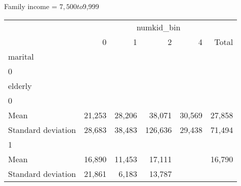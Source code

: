 Family income = $7,500 to $9,999
\begin{tabular}{llllll}
\cline{1-6}
\multicolumn{1}{c}{} &
  \multicolumn{5}{|c}{numkid\_bin} \\
\multicolumn{1}{c}{} &
  \multicolumn{1}{|r}{0} &
  \multicolumn{1}{r}{1} &
  \multicolumn{1}{r}{2} &
  \multicolumn{1}{r}{4} &
  \multicolumn{1}{r}{Total} \\
\cline{1-6}
\multicolumn{1}{l}{marital} &
  \multicolumn{1}{|r}{} &
  \multicolumn{1}{r}{} &
  \multicolumn{1}{r}{} &
  \multicolumn{1}{r}{} &
  \multicolumn{1}{r}{} \\
\multicolumn{1}{l}{\hspace{1em}0} &
  \multicolumn{1}{|r}{} &
  \multicolumn{1}{r}{} &
  \multicolumn{1}{r}{} &
  \multicolumn{1}{r}{} &
  \multicolumn{1}{r}{} \\
\multicolumn{1}{l}{\hspace{2em}elderly} &
  \multicolumn{1}{|r}{} &
  \multicolumn{1}{r}{} &
  \multicolumn{1}{r}{} &
  \multicolumn{1}{r}{} &
  \multicolumn{1}{r}{} \\
\multicolumn{1}{l}{\hspace{3em}0} &
  \multicolumn{1}{|r}{} &
  \multicolumn{1}{r}{} &
  \multicolumn{1}{r}{} &
  \multicolumn{1}{r}{} &
  \multicolumn{1}{r}{} \\
\multicolumn{1}{l}{\hspace{4em}Mean} &
  \multicolumn{1}{|r}{21,253} &
  \multicolumn{1}{r}{28,206} &
  \multicolumn{1}{r}{38,071} &
  \multicolumn{1}{r}{30,569} &
  \multicolumn{1}{r}{27,858} \\
\multicolumn{1}{l}{\hspace{4em}Standard deviation} &
  \multicolumn{1}{|r}{28,683} &
  \multicolumn{1}{r}{38,483} &
  \multicolumn{1}{r}{126,636} &
  \multicolumn{1}{r}{29,438} &
  \multicolumn{1}{r}{71,494} \\
\multicolumn{1}{l}{\hspace{3em}1} &
  \multicolumn{1}{|r}{} &
  \multicolumn{1}{r}{} &
  \multicolumn{1}{r}{} &
  \multicolumn{1}{r}{} &
  \multicolumn{1}{r}{} \\
\multicolumn{1}{l}{\hspace{4em}Mean} &
  \multicolumn{1}{|r}{16,890} &
  \multicolumn{1}{r}{11,453} &
  \multicolumn{1}{r}{17,111} &
  \multicolumn{1}{r}{} &
  \multicolumn{1}{r}{16,790} \\
\multicolumn{1}{l}{\hspace{4em}Standard deviation} &
  \multicolumn{1}{|r}{21,861} &
  \multicolumn{1}{r}{6,183} &
  \multicolumn{1}{r}{13,787} &

\end{tabular}
